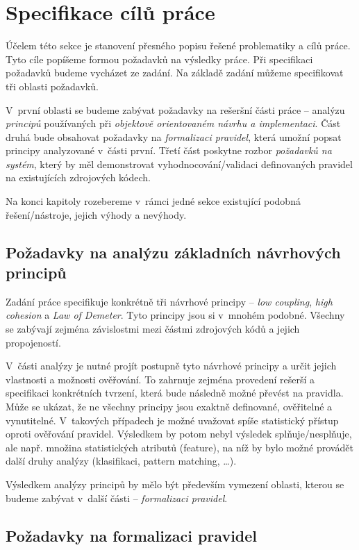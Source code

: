 \chapter{Specifikace cílů práce}

Účelem této sekce je stanovení přesného popisu řešené problematiky a cílů práce. Tyto cíle popíšeme formou požadavků na výsledky práce. Při specifikaci požadavků budeme vycházet ze zadání. Na základě zadání můžeme specifikovat tři oblasti požadavků.

V~první oblasti se budeme zabývat požadavky na rešeršní části práce -- analýzu \emph{principů} používaných při \emph{objektově orientovaném návrhu a implementaci}. Část druhá bude obsahovat požadavky na \emph{formalizaci pravidel}, která umožní popsat principy analyzované v~části první. Třetí část poskytne rozbor \emph{požadavků na systém}, který by měl demonstrovat vyhodnocování/validaci definovaných pravidel na existujících zdrojových kódech.

Na konci kapitoly rozebereme v~rámci jedné sekce existující podobná řešení/nástroje, jejich výhody a nevýhody.

\section{Požadavky na analýzu základních návrhových principů}
\label{requirements-principle_analysis}
Zadání práce specifikuje konkrétně tři návrhové principy -- \emph{low coupling}, \emph{high cohesion} a \emph{Law of Demeter}. Tyto principy jsou si v~mnohém podobné. Všechny se zabývají zejména závislostmi mezi částmi zdrojových kódů a jejich propojeností.

V~části analýzy je nutné projít postupně tyto návrhové principy a určit jejich vlastnosti a možnosti ověřování. To zahrnuje zejména provedení rešerší a specifikaci konkrétních tvrzení, která bude následně možné převést na pravidla. Může se ukázat, že ne všechny principy jsou exaktně definované, ověřitelné a vynutitelné. V~takových případech je možné uvažovat spíše statistický přístup oproti ověřování pravidel. Výsledkem by potom nebyl výsledek splňuje/nesplňuje, ale např. množina statistických atributů (feature), na níž by bylo možné provádět další druhy analýzy (klasifikaci, pattern matching, \ldots).

Výsledkem analýzy principů by mělo být především vymezení oblasti, kterou se budeme zabývat v~další části -- \emph{formalizaci pravidel}.

\section{Požadavky na formalizaci pravidel}

